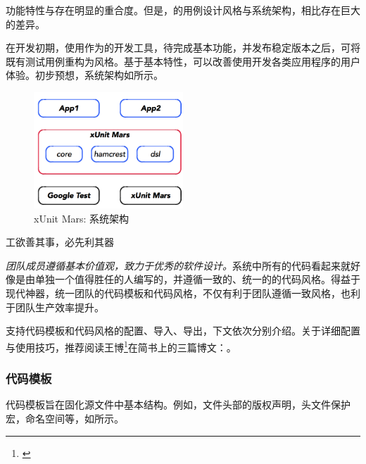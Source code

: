 \begin{content}

功能特性与存在明显的重合度。但是，的用例设计风格与系统架构，相比存在巨大的差异。

在开发初期，使用作为的开发工具，待完成基本功能，并发布稳定版本之后，可将既有测试用例重构为风格。基于基本特性，可以改善使用开发各类应用程序的用户体验。初步预想，系统架构如所示。

\begin{figure}[H]
\centering
\includegraphics[width=0.5\textwidth]{figures/xunit/framework.png}
\caption{xUnit Mars: 系统架构}
 \label{fig:mars-framework}
\end{figure}

\begin{episode}{工欲善其事，必先利其器}
\begin{content}

\emph{团队成员遵循基本价值观，致力于优秀的软件设计。}系统中所有的代码看起来就好像是由单独一个值得胜任的人编写的，并遵循一致的、统一的的代码风格。得益于现代神器，统一团队的代码模板和代码风格，不仅有利于团队遵循一致风格，也利于团队生产效率提升。

支持代码模板和代码风格的配置、导入、导出，下文依次分别介绍。关于详细配置与使用技巧，推荐阅读王博\footnote{\href{https://www.jianshu.com/u/92b7d9879f20}{}}在简书上的三篇博文：\href{https://www.jianshu.com/p/dafcdce1f9cb}{}。

\subsubsection{代码模板}

代码模板旨在固化源文件中基本结构。例如，文件头部的版权声明，头文件保护宏，命名空间等，如所示。


\end{content}
\end{episode}
\end{content}
